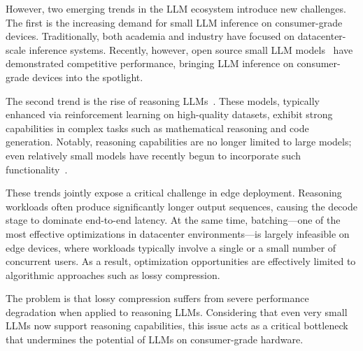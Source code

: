 However, two emerging trends in the LLM ecosystem introduce new challenges. The first is the increasing demand for small LLM inference on consumer-grade devices. Traditionally, both academia and industry have focused on datacenter-scale inference systems. Recently, however, open source small LLM models~\cite{Llama3-8B, Qwen3-4B-Thinking-2507, MobileLLM-R1-950M, Gemma3-270m} have demonstrated competitive performance, bringing LLM inference on consumer-grade devices into the spotlight.

The second trend is the rise of reasoning LLMs~\cite{Qwen3-8B, Deepseek-R1-Distillated-Llama3-8B}. These models, typically enhanced via reinforcement learning on high-quality datasets, exhibit strong capabilities in complex tasks such as mathematical reasoning and code generation. Notably, reasoning capabilities are no longer limited to large models; even relatively small models have recently begun to incorporate such functionality~\cite{Qwen3-4B-Thinking-2507, MobileLLM-R1-950M}.

These trends jointly expose a critical challenge in edge deployment. Reasoning workloads often produce significantly longer output sequences, causing the decode stage to dominate end-to-end latency. At the same time, batching—one of the most effective optimizations in datacenter environments—is largely infeasible on edge devices, where workloads typically involve a single or a small number of concurrent users. As a result, optimization opportunities are effectively limited to algorithmic approaches such as lossy compression.

The problem is that lossy compression suffers from severe performance degradation when applied to reasoning LLMs. Considering that even very small LLMs now support reasoning capabilities, this issue acts as a critical bottleneck that undermines the potential of LLMs on consumer-grade hardware.

